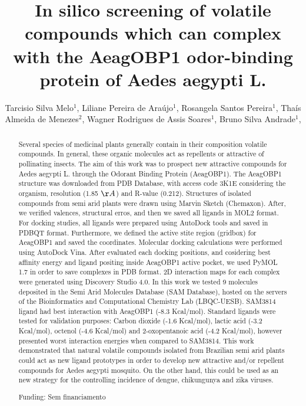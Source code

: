 \documentclass[twoside]{article}
\title{\vspace{-15mm}\fontsize{24pt}{10pt}\selectfont\textbf{ In silico screening of volatile compounds which can complex with the AeagOBP1 odor-binding protein of Aedes aegypti L. }} %
\author{ Tarcisio Silva Melo$^{1}$, Liliane Pereira de Araújo$^{1}$, Rosangela Santos Pereira$^{1}$, Thaís Almeida de Menezes$^{2}$, Wagner Rodrigues de Assis Soares$^{1}$, Bruno Silva Andrade$^{1}$, }
\affil{ 1 Universidade Estadual do Sudoeste da Bahia

2 Universidade Estadual de Feira de Santana

 }
\date{}
\begin{document}
  
  
  \maketitle %
  
  
  \thispagestyle{fancy} %
  
  
  \begin{abstract}
  Several species of medicinal plants generally contain in their composition volatile compounds. In general, these organic molecules act as repellents or attractive of pollinating insects. The aim of this work was to prospect new attractive compounds for Aedes aegypti L. through the Odorant Binding Protein (AeagOBP1). The AeagOBP1 structure was downloaded from PDB Database, with access code 3K1E considering the organism, resolution (1.85 $\AA$) and R-value (0.212). Structures of isolated compounds from semi arid plants were drawn using Marvin Sketch (Chemaxon). After, we verified valences, structural erros, and then we saved all ligands in MOL2 format. For docking studies, all ligands were prepared using AutoDock tools and saved in PDBQT format. Furthermore, we defined the active stite region (gridbox) for AeagOBP1 and saved the coordinates. Molecular docking calculations were performed using AutoDock Vina. After evaluated each docking positions, and cosidering best affinity energy and ligand positing inside AeagOBP1 active pocket, we used PyMOL 1.7 in order to save complexes in PDB format. 2D interaction maps for each complex were generated using Discovery Studio 4.0. In this work we tested 9 molecules deposited in the Semi Arid Molecules Database (SAM Database), hosted on the servers of the Bioinformatics and Computational Chemistry Lab (LBQC-UESB). SAM3814 ligand had best interaction with AeagOBP1 (-8.3 Kcal/mol). Standard ligands were tested for validation purposes: Carbon dioxide (-1.6 Kcal/mol), lactic acid (-3.2 Kcal/mol), octenol (-4.6 Kcal/mol) and 2-oxopentanoic acid (-4.2 Kcal/mol), however presented worst interaction energies when compared to SAM3814.  This work demonstrated that natural volatile compounds isolated from Brazilian semi arid plants could act as new ligand prototypes in order to develop new attractive and/or repellent compounds for Aedes aegypti mosquito. On the other hand, this could be used as an new strategy for the controlling incidence of dengue, chikungunya and zika viruses.
  
  Funding: Sem financiamento \\ 
  \end{abstract}
  
\end{document}
